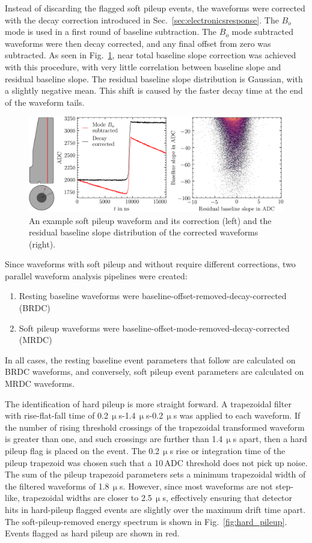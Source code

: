 Instead of discarding the flagged soft pileup events, the waveforms were corrected with the decay correction introduced in Sec.~\ref{sec:electronicsresponse}. The $B_o$ mode is used in a first round of baseline subtraction. The $B_o$ mode subtracted waveforms were then decay corrected, and any final offset from zero was subtracted. As seen in Fig.~\ref{fig:soft_pileup_corr}, near total baseline slope correction was achieved with this procedure, with very little correlation between baseline slope and residual baseline slope. The residual baseline slope distribution is Gaussian, with a slightly negative mean. This shift is caused by the faster decay time at the end of the waveform tails.  
\begin{figure}[htb]
    \centering
    \includegraphics[width=6in]{figs/param/soft_pileup_corr_6_9in.png}
    \caption{An example soft pileup waveform and its correction (left) and the residual baseline slope distribution of the corrected waveforms (right).}
    \label{fig:soft_pileup_corr}
\end{figure}

Since waveforms with soft pileup and without require different corrections, two parallel waveform analysis pipelines were created: 
\begin{enumerate}
	\item Resting baseline waveforms were baseline-offset-removed-decay-corrected (BRDC)
	\item Soft pileup waveforms were baseline-offset-mode-removed-decay-corrected (MRDC)
\end{enumerate}
In all cases, the resting baseline event parameters that follow are calculated on BRDC waveforms, and conversely, soft pileup event parameters are calculated on MRDC waveforms. 

The identification of hard pileup is more straight forward. A trapezoidal filter with rise-flat-fall time of 0.2\,$\upmu$s-1.4\,$\upmu$s-0.2\,$\upmu$s was applied to each waveform. If the number of rising threshold crossings of the trapezoidal transformed waveform is greater than one, and such crossings are further than 1.4\,$\upmu$s apart, then a hard pileup flag is placed on the event. The 0.2\,$\upmu$s rise or integration time of the pileup trapezoid was chosen such that a 10\,ADC threshold does not pick up noise. The sum of the pileup trapezoid parameters sets a minimum trapezoidal width of the filtered waveforms of 1.8\,$\upmu$s. However, since most waveforms are not step-like, trapezoidal widths are closer to 2.5\,$\upmu$s, effectively ensuring that detector hits in hard-pileup flagged events are slightly over the maximum drift time apart. The soft-pileup-removed \CsS{} energy spectrum is shown in Fig.~\ref{fig:hard_pileup}. Events flagged as hard pileup are shown in red. 

